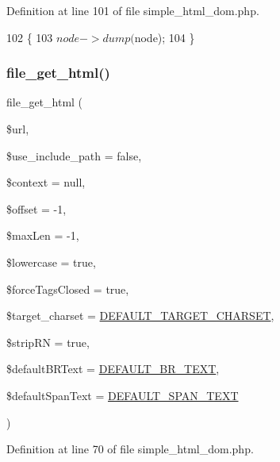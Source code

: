 Definition at line 101 of file simple\+\_\+html\+\_\+dom.\+php.


\begin{DoxyCode}
102 \{
103     $node->dump($node);
104 \}
\end{DoxyCode}
\hypertarget{simple__html__dom_8php_af2164941db8b68168c1105687e179d27}{}\label{simple__html__dom_8php_af2164941db8b68168c1105687e179d27} 
\subsubsection{\texorpdfstring{file\+\_\+get\+\_\+html()}{file\_get\_html()}}
{\footnotesize\ttfamily file\+\_\+get\+\_\+html (\begin{DoxyParamCaption}\item[{}]{\$url,  }\item[{}]{\$use\+\_\+include\+\_\+path = {\ttfamily false},  }\item[{}]{\$context = {\ttfamily null},  }\item[{}]{\$offset = {\ttfamily -\/1},  }\item[{}]{\$max\+Len = {\ttfamily -\/1},  }\item[{}]{\$lowercase = {\ttfamily true},  }\item[{}]{\$force\+Tags\+Closed = {\ttfamily true},  }\item[{}]{\$target\+\_\+charset = {\ttfamily \hyperlink{simple__html__dom_8php_aeb01f6d83a65d695ad327473f838319a}{D\+E\+F\+A\+U\+L\+T\+\_\+\+T\+A\+R\+G\+E\+T\+\_\+\+C\+H\+A\+R\+S\+ET}},  }\item[{}]{\$strip\+RN = {\ttfamily true},  }\item[{}]{\$default\+B\+R\+Text = {\ttfamily \hyperlink{simple__html__dom_8php_a898bdf60fe4d05c1c50013eed5e2c6e8}{D\+E\+F\+A\+U\+L\+T\+\_\+\+B\+R\+\_\+\+T\+E\+XT}},  }\item[{}]{\$default\+Span\+Text = {\ttfamily \hyperlink{simple__html__dom_8php_a30d58d7d3a53efc61f064b53a434bafe}{D\+E\+F\+A\+U\+L\+T\+\_\+\+S\+P\+A\+N\+\_\+\+T\+E\+XT}} }\end{DoxyParamCaption})}



Definition at line 70 of file simple\+\_\+html\+\_\+dom.\+php.



